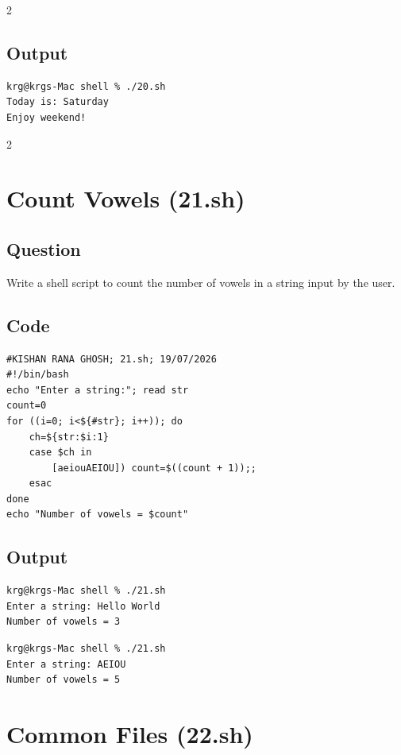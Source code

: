 \documentclass[a4paper,12pt]{article}
\begin{document}
\begin{multicols}{2}
\subsection*{Output}
\begin{lstlisting}[style=outputstyle]
krg@krgs-Mac shell % ./20.sh
Today is: Saturday
Enjoy weekend!
\end{lstlisting}

\end{multicols}
\newpage

\begin{multicols}{2}

\section{Count Vowels (21.sh)}
\subsection*{Question}
Write a shell script to count the number of vowels in a string input by the user.

\subsection*{Code}
\begin{lstlisting}[style=bashstyle]
#KISHAN RANA GHOSH; 21.sh; 19/07/2026
#!/bin/bash
echo "Enter a string:"; read str
count=0
for ((i=0; i<${#str}; i++)); do
    ch=${str:$i:1}
    case $ch in
        [aeiouAEIOU]) count=$((count + 1));;
    esac
done
echo "Number of vowels = $count"
\end{lstlisting}

\subsection*{Output}
\begin{lstlisting}[style=outputstyle]
krg@krgs-Mac shell % ./21.sh
Enter a string: Hello World
Number of vowels = 3
\end{lstlisting}
\begin{lstlisting}[style=outputstyle]
krg@krgs-Mac shell % ./21.sh
Enter a string: AEIOU
Number of vowels = 5
\end{lstlisting}

\columnbreak

\section{Common Files (22.sh)}

\end{multicols}
\end{document}
